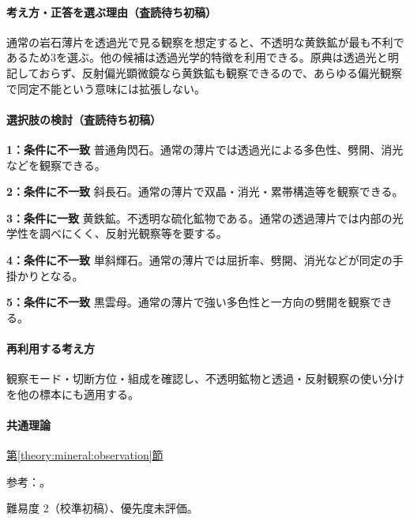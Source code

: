 \paragraph{考え方・正答を選ぶ理由（査読待ち初稿）} 通常の岩石薄片を透過光で見る観察を想定すると、不透明な黄鉄鉱が最も不利であるため3を選ぶ。他の候補は透過光学的特徴を利用できる。原典は透過光と明記しておらず、反射偏光顕微鏡なら黄鉄鉱も観察できるので、あらゆる偏光観察で同定不能という意味には拡張しない。

\paragraph{選択肢の検討（査読待ち初稿）}\mbox{}\par

\noindent\textbf{1：条件に不一致} 普通角閃石。通常の薄片では透過光による多色性、劈開、消光などを観察できる。\par

\noindent\textbf{2：条件に不一致} 斜長石。通常の薄片で双晶・消光・累帯構造等を観察できる。\par

\noindent\textbf{3：条件に一致} 黄鉄鉱。不透明な硫化鉱物である。通常の透過薄片では内部の光学性を調べにくく、反射光観察等を要する。\par

\noindent\textbf{4：条件に不一致} 単斜輝石。通常の薄片では屈折率、劈開、消光などが同定の手掛かりとなる。\par

\noindent\textbf{5：条件に不一致} 黒雲母。通常の薄片で強い多色性と一方向の劈開を観察できる。\par

\paragraph{再利用する考え方} 観察モード・切断方位・組成を確認し、不透明鉱物と透過・反射観察の使い分けを他の標本にも適用する。

\paragraph{共通理論} \hyperref[theory:mineral:observation]{第\ref*{theory:mineral:observation}節}

\par 参考：\cite{hom_pyrite}。

\par 難易度 2（校準初稿）、優先度未評価。

